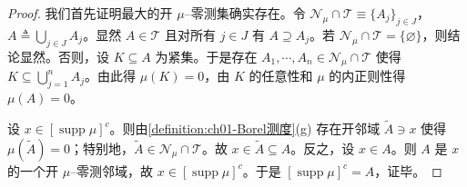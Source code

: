 \documentclass[../../main.tex]{subfiles}%
\begin{document}
\begin{proof}
我们首先证明最大的开 $\mu$--零测集确实存在。令 $\mathcal{N}_\mu\cap\mathcal{T}\equiv\{A_j\}_{j\in J}$，$A\triangleq \bigcup_{j\in J}A_j$。显然 $A\in\mathcal{T}$ 且对所有 $j\in J$ 有 $A\supseteq A_j$。若 $\mathcal{N}_\mu\cap\mathcal{T}=\{\varnothing \}$，则结论显然。否则，设 $K\subseteq A$ 为紧集。于是存在 $A_1,\cdots ,A_n\in\mathcal{N}_\mu\cap\mathcal{T}$ 使得 $K\subseteq\bigcup_{j=1}^n A_j$。由此得 $\mu(K)=0$，由 $K$ 的任意性和 $\mu$ 的内正则性得 $\mu(A)=0$。

设 $x\in[\operatorname{supp}\mu]^c$。则由\cref{definition:ch01-Borel测度}(g) 存在开邻域 $\widetilde{A}\ni x$ 使得 $\mu(\widetilde{A})=0$；特别地，$\widetilde{A}\in\mathcal{N}_\mu\cap\mathcal{T}$。故 $x\in\widetilde{A}\subseteq A$。反之，设 $x\in A$。则 $A$ 是 $x$ 的一个开 $\mu$--零测邻域，故 $x\in[\operatorname{supp}\mu]^c$。于是 $[\operatorname{supp}\mu]^c=A$，证毕。
\end{proof}
\end{document}
